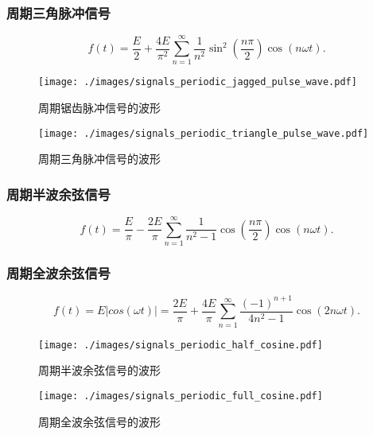 \subsubsection{周期三角脉冲信号}
\srmg
\begin{equation}
    f(t)=\frac{E}{2}+\frac{4E}{\pi^2}\sum_{n=1}^{\infty}\frac{1}{n^2}\sin^2\left(\frac{n\pi}{2}\right)\cos(n\omega t).
\end{equation}

\begin{figure}[H]
    \centering
    \begin{minipage}{.527\textwidth}
        \centering
        \texttt{[image: ./images/signals\_periodic\_jagged\_pulse\_wave.pdf]}
        \caption{周期锯齿脉冲信号的波形}
    \end{minipage}
    \begin{minipage}{.453\textwidth}
        \centering
        \texttt{[image: ./images/signals\_periodic\_triangle\_pulse\_wave.pdf]}
        \caption{周期三角脉冲信号的波形}
    \end{minipage}
\end{figure}

\subsubsection{周期半波余弦信号}
\srmg
\begin{equation}
    f(t)=\frac{E}{\pi}-\frac{2E}{\pi}\sum_{n=1}^{\infty}\frac{1}{n^2-1}\cos\left(\frac{n\pi}{2}\right)\cos(n\omega t).
\end{equation}

\subsubsection{周期全波余弦信号}
\srmg
\begin{equation}
    f(t)=E|cos(\omega t)|=\frac{2E}{\pi}+\frac{4E}{\pi}\sum_{n=1}^{\infty}\frac{(-1)^{n+1}}{4n^2-1}\cos(2n\omega t).
\end{equation}

\begin{figure}[H]
    \centering
    \begin{minipage}{.49\textwidth}
        \centering
        \texttt{[image: ./images/signals\_periodic\_half\_cosine.pdf]}
        \caption{周期半波余弦信号的波形}
    \end{minipage}
    \begin{minipage}{.49\textwidth}
        \centering
        \texttt{[image: ./images/signals\_periodic\_full\_cosine.pdf]}
        \caption{周期全波余弦信号的波形}
    \end{minipage}
\end{figure}
